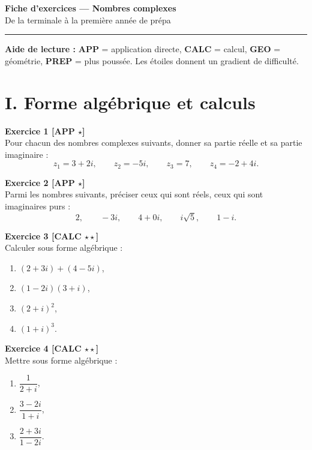 \documentclass[11pt,a4paper]{article}
\begin{document}
\begin{center}
    {\LARGE \textbf{Fiche d’exercices --- Nombres complexes}}\\[0.3em]
    {\large De la terminale à la première année de prépa}
\end{center}

\hrule
\vspace{0.8em}

\textbf{Aide de lecture :}  
\textbf{APP} = application directe, \textbf{CALC} = calcul, \textbf{GEO} = géométrie, \textbf{PREP} = plus poussée.  
Les étoiles donnent un gradient de difficulté.

\tableofcontents

\newpage

\section*{I. Forme algébrique et calculs}

\textbf{Exercice 1 [APP $\star$]}\\
Pour chacun des nombres complexes suivants, donner sa partie réelle et sa partie imaginaire :
\[
z_1=3+2i,\qquad z_2=-5i,\qquad z_3=7,\qquad z_4=-2+4i.
\]

\textbf{Exercice 2 [APP $\star$]}\\
Parmi les nombres suivants, préciser ceux qui sont réels, ceux qui sont imaginaires purs :
\[
2,\qquad -3i,\qquad 4+0i,\qquad i\sqrt{5},\qquad 1-i.
\]

\textbf{Exercice 3 [CALC $\star\star$]}\\
Calculer sous forme algébrique :
\begin{enumerate}[label=\alph*)]
    \item \((2+3i)+(4-5i)\),
    \item \((1-2i)(3+i)\),
    \item \((2+i)^2\),
    \item \((1+i)^3\).
\end{enumerate}

\textbf{Exercice 4 [CALC $\star\star$]}\\
Mettre sous forme algébrique :
\begin{enumerate}[label=\alph*)]
    \item \(\dfrac{1}{2+i}\),
    \item \(\dfrac{3-2i}{1+i}\),
    \item \(\dfrac{2+3i}{1-2i}\).
\end{enumerate}
\end{document}

